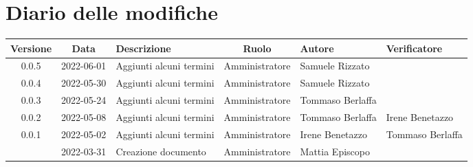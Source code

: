 \section*{Diario delle modifiche}
	\begin{center}
	\renewcommand{\arraystretch}{1.8} %
	\begin{longtable}{ |c|c|p{8em}|c|m{5em}|m{6em}| }
	\hline
	\textbf{Versione} & \textbf{Data} & \textbf{Descrizione} &  \textbf{Ruolo} &  \textbf{Autore} & \textbf{Verificatore}\\ %
	\hline %
	0.0.5 & 2022-06-01 & Aggiunti alcuni termini & Amministratore & Samuele \newline Rizzato & \\
	\hline
	0.0.4 & 2022-05-30 & Aggiunti alcuni termini & Amministratore & Samuele \newline Rizzato & \\
	\hline
	0.0.3 & 2022-05-24 & Aggiunti alcuni termini & Amministratore & Tommaso \newline Berlaffa & \\
	\hline
	0.0.2 & 2022-05-08 & Aggiunti alcuni termini & Amministratore & Tommaso \newline Berlaffa & Irene \newline Benetazzo\\
	\hline
	0.0.1 & 2022-05-02 & Aggiunti alcuni termini & Amministratore & Irene \newline Benetazzo & Tommaso \newline Berlaffa\\
	\hline
  	& 2022-03-31 & Creazione documento & Amministratore & Mattia \newline Episcopo & \\ 
	\hline
	\end{longtable}
	\end{center}
	\newpage